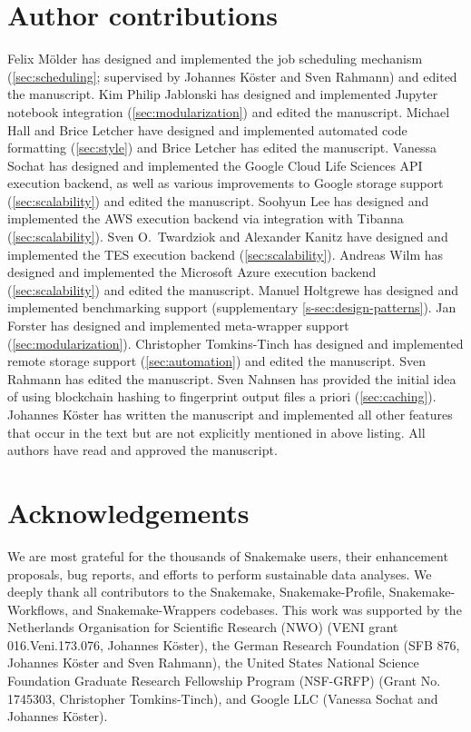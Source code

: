 \documentclass[10pt,a4paper,twocolumn]{article}
\begin{document}
\section{Author contributions}
Felix Mölder has designed and implemented the job scheduling mechanism (\autoref{sec:scheduling}; supervised by Johannes Köster and Sven Rahmann) and edited the manuscript.
Kim Philip Jablonski has designed and implemented Jupyter notebook integration (\autoref{sec:modularization}) and edited the manuscript.
Michael Hall and Brice Letcher have designed and implemented automated code formatting (\autoref{sec:style}) and Brice Letcher has edited the manuscript.
Vanessa Sochat has designed and implemented the Google Cloud Life Sciences API execution backend, as well as various improvements to Google storage support (\autoref{sec:scalability}) and edited the manuscript.
Soohyun Lee has designed and implemented the AWS execution backend via integration with Tibanna (\autoref{sec:scalability}).
Sven O.\ Twardziok and Alexander Kanitz have designed and implemented the TES execution backend (\autoref{sec:scalability}).
Andreas Wilm has designed and implemented the Microsoft Azure execution backend (\autoref{sec:scalability}) and edited the manuscript.
Manuel Holtgrewe has designed and implemented benchmarking support (supplementary \autoref{s-sec:design-patterns}).
Jan Forster has designed and implemented meta-wrapper support (\autoref{sec:modularization}).
Christopher Tomkins-Tinch has designed and implemented remote storage support (\autoref{sec:automation}) and edited the manuscript.
Sven Rahmann has edited the manuscript.
Sven Nahnsen has provided the initial idea of using blockchain hashing to fingerprint output files a priori (\autoref{sec:caching}).
Johannes Köster has written the manuscript and implemented all other features that occur in the text but are not explicitly mentioned in above listing.
All authors have read and approved the manuscript.

\section{Acknowledgements}
We are most grateful for the thousands of Snakemake users, their enhancement proposals, bug reports, and efforts to perform sustainable data analyses.
We deeply thank all contributors to the Snakemake, Snakemake-Profile, Snakemake-Workflows, and Snakemake-Wrappers codebases.
This work was supported by the Netherlands Organisation for Scientific Research (NWO) (VENI grant 016.Veni.173.076, Johannes Köster), the German Research Foundation (SFB 876, Johannes Köster and Sven Rahmann), the United States National Science Foundation Graduate Research Fellowship Program (NSF-GRFP) (Grant No. 1745303, Christopher Tomkins-Tinch), and Google LLC (Vanessa Sochat and Johannes Köster).

\printbibliography
\end{document}
